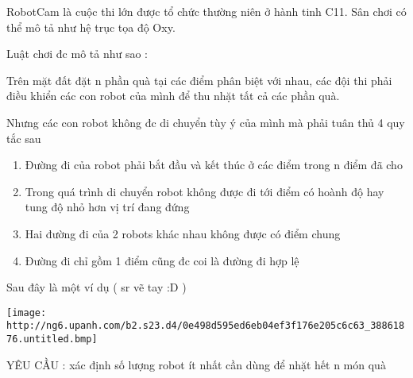 RobotCam là cuộc thi lớn được tổ chức thường niên ở hành tinh C11. Sân chơi có thể mô tả như hệ trục tọa độ Oxy.

Luật chơi đc mô tả như sao :

Trên mặt đất đặt n phần quà tại các điểm phân biệt với nhau, các đội thi phải điều khiển các con robot của mình để thu nhặt tất cả các phần quà.

Nhưng các con robot không đc di chuyển tùy ý của mình mà phải tuân thủ 4 quy tắc sau
\begin{enumerate}
	\item Đường đi của robot phải bắt đầu và kết      thúc ở các điểm trong n điểm đã cho
	\item Trong quá trình di chuyển robot không được      đi tới điểm có hoành độ hay tung độ nhỏ hơn vị trí đang đứng
	\item Hai đường đi của 2 robots khác nhau không      được có điểm chung
	\item Đường đi chỉ gồm 1 điểm cũng đc coi là      đường đi hợp lệ
\end{enumerate}

Sau đây là một ví dụ ( sr vẽ tay :D )


\texttt{[image: http://ng6.upanh.com/b2.s23.d4/0e498d595ed6eb04ef3f176e205c6c63\_38861876.untitled.bmp]}

YÊU CẦU : xác định số lượng robot ít nhất cần dùng để nhặt hết n món quà